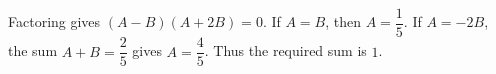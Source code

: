 Factoring gives $(A-B)(A+2B)=0 $. If $ A=B $, then $ A=\dfrac{1}{5}$. If $ A=-2B $, the sum $ A+B=\dfrac{2}{5}$ gives $ A=\dfrac{4}{5}$. Thus the required sum is $\boxed1 $.
